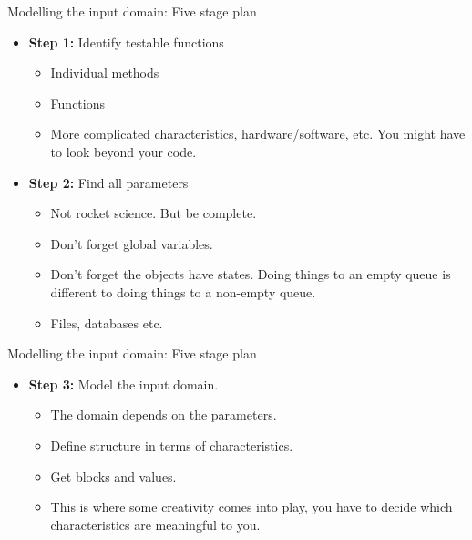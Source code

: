 \documentclass{beamer}
\begin{document}
\begin{frame}{Modelling the input domain: Five stage plan}

  \begin{itemize}
  \item {\bf Step 1:} Identify testable functions
    \begin{itemize}
    \item Individual methods
    \item Functions
    \item More complicated characteristics, hardware/software,
      etc. You might have to look beyond your code.
    \end{itemize}
  \item {\bf Step 2:} Find all parameters
    \begin{itemize}
    \item Not rocket science. But be complete.
    \item Don't forget global variables.
    \item Don't forget the objects have states. Doing things to an
      empty queue is different to doing things to a non-empty queue.
    \item Files, databases etc.
    \end{itemize}
  \end{itemize}
  \end{frame}
\begin{frame}{Modelling the input domain: Five stage plan}
  \begin{itemize}
  \item {\bf Step 3:} Model the input domain.
    \begin{itemize}
    \item The domain depends on the parameters.
    \item Define structure in terms of characteristics.
    \item Get blocks and values.
    \item This is where some creativity comes into play, you have to
      decide which characteristics are meaningful to you. 
    \end{itemize}
  \end{itemize}
\end{frame}
\end{document}
